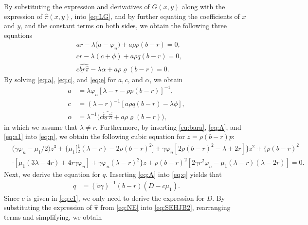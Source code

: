 \documentclass[11pt]{article}
\newcommand \la {\lambda}
\newcommand \ba {\tilde{a}}
\newcommand \varp {\varphi}
\numberwithin{equation}{section}
\begin{document}
	By substituting the expression and derivatives of \(G(x, y)\) along with the expression of \(\widehat{\pi}(x,y)\), into \eqref{eq:LG}, and by further equating the coefficients of \(x\) and \(y\), and the constant terms on both sides, we obtain the following three equations
	\begin{align}
		&ar-\lambda\Big(a-\varp_{n}\Big)+a\rho p(b-r) =0,
		\label{eq:a}\\
		&cr-\lambda(c+\phi)+a\rho q(b-r)=0,
		\label{eq:c}\\
		&c\widehat{\underline{br}\widehat{\pi}}-\lambda \alpha+a\rho \varrho(b-r)=0.
		\label{eq:e}
	\end{align}
	By solving \eqref{eq:a}, \eqref{eq:c}, and \eqref{eq:e} for $a, c$, and $\alpha$, we obtain
	\begin{align}
		a &= \lambda \varphi_n[\lambda-r-\rho p(b-r)]^{-1}, \label{eq:a1} \\
		c &=(\lambda-r)^{-1}[a\rho q(b-r)-\lambda\phi], \label{eq:c1} \\
		\alpha &=\la^{-1}\big({c\widehat{\underline{br}\widehat{\pi}}+a\rho \varrho(b-r)}\big), \label{eq:e1}
	\end{align}
	in which we assume that $\la \neq r$. Furthermore, by inserting \eqref{eq:bara}, \eqref{eq:A}, and \eqref{eq:a1} into \eqref{eq:p},  we obtain the following cubic equation for $z=\rho(b-r)p$:
	\begin{align}
		&\big(\gamma\varphi_n-\mu_{1}/2\big)z^3+\big\{\mu_{1}\big[\frac{1}{2} (\lambda-r)-2\rho(b-r)^2\big]+\gamma\varphi_n[2\rho(b-r)^2-\lambda+2r]\big\}z^2+\{\rho(b-r)^2\\
		&\cdot[\mu_{1}(3\lambda-4r)+4r\gamma\varphi_n]+\gamma\varphi_n(\lambda-r)^2\}z+\rho(b-r)^2[2\gamma r^2\varphi_n-\mu_{1}(\lambda-r)(\lambda-2r)]=0.
		\label{eq:p1}	
	\end{align}	
	Next, we derive the equation for $q$. Inserting \eqref{eq:A} into \eqref{eq:q} yields that
	\begin{align}
		q&=(\ba\gamma)^{-1}(b-r)(D -c \mu_1). \label{eq:q1}
	\end{align}
	Since $c$ is given in \eqref{eq:c1}, we only need to derive the expression for \(D\). By substituting the expression of \(\widehat{\pi}\) from \eqref{eq:NE} into \eqref{eq:SEHJB2}, rearranging terms and simplifying, we obtain
\end{document}
